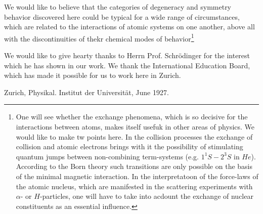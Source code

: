 \documentclass{article}
\begin{document}
We would like to believe that the categories of degeneracy and symmetry behavior discovered here could be typical for a wide range of circumstances, which are related to the interactions of atomic systems on one another, above all with the discontinuities of thekr chemical modes of behavior\footnote{One will see whether the exchange phenomena, which is so decisive for the interactions between atoms, makes itself usefuk in other areas of physics. We would like to make tw points here. In the collision processes the exchange of collision and atomic electrons brings with it the possibility of stimulating quantum jumps between  non-combining term-systems (e.g. $1^1S - 2^3S$ in $He$). According to the Born theory such transitions are only possible on the basis of the minimal magnetic interaction. In the interpretatoon of the force-laws of the atomic nucleus, which are manifested in the scattering experiments with $\alpha$- or $H$-particles, one will have to take into acdount the exchange of nuclear constituents as an essential influence.}

We would like to give hearty thanks to Herrn Prof. Schr\"odinger for the interest which he has shown in our work. We thank the International Education Board, which has made it possible for us to work here in Zurich.

Zurich, Physikal. Institut der Universität, June 1927.
\end{document}
